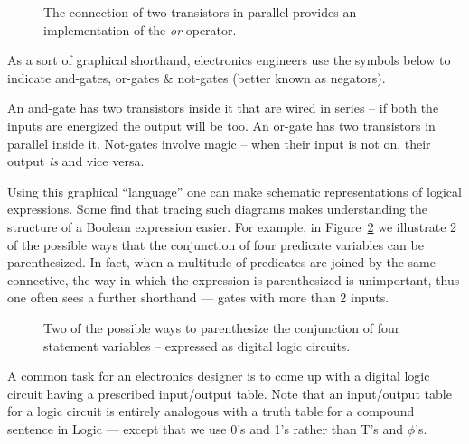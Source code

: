 \begin{figure}[!hbtp] 
\begin{center}

\end{center}
\caption[Parallel connections implement \emph{or}.]{%
The connection of two transistors in parallel provides %
an implementation of the {\em or} operator.}
\label{fig:par}
\end{figure}

\newpage

As a sort of graphical shorthand, electronics engineers use the symbols
below to indicate and-gates, or-gates \& not-gates (better known as negators).

\begin{center}

\end{center}

An and-gate has two transistors inside it that are wired in series -- 
if both the inputs are energized the output will be too.  An
or-gate has two transistors in parallel inside it.  Not-gates 
involve magic -- when their input is not on, their output \emph{is}
and vice versa.

Using this graphical ``language'' one can make schematic 
representations of logical expressions.  Some find that 
tracing such diagrams makes understanding the structure 
of a Boolean expression easier.  For example, in Figure~\ref{fig:3ands}
we illustrate 2 of the possible ways that the conjunction
of four predicate variables can be parenthesized.  In fact, when
a multitude of predicates are joined by the same connective,
the way in which the expression is parenthesized is unimportant,
thus one often sees a further shorthand --- gates with more than
2 inputs.

\begin{figure}[!hbtp] 
\centerline{}
\caption[Parenthesizations expressed as digital logic circuits.]{%
Two of the possible ways to parenthesize the conjunction %
of four statement variables -- expressed as digital logic circuits.}
\label{fig:3ands}
\end{figure}

A common task for an electronics designer is to come up with
a digital logic circuit having a prescribed input/output table.
Note that an input/output table for a logic circuit is entirely
analogous with a truth table for a compound sentence in Logic ---
except that we use 0's and 1's rather than T's and $\phi$'s.

